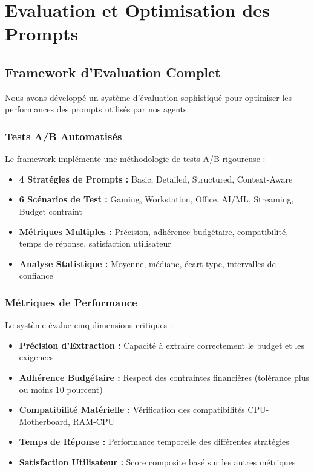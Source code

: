 \documentclass[12pt,a4paper]{article}
\begin{document}
\section{Evaluation et Optimisation des Prompts}

\subsection{Framework d'Evaluation Complet}
Nous avons d\'evelopp\'e un syst\`eme d'\'evaluation sophistiqu\'e pour optimiser les performances des prompts utilis\'es par nos agents.

\subsubsection{Tests A/B Automatis\'es}
Le framework impl\'emente une m\'ethodologie de tests A/B rigoureuse :
\begin{itemize}
    \item \textbf{4 Strat\'egies de Prompts :} Basic, Detailed, Structured, Context-Aware
    \item \textbf{6 Sc\'enarios de Test :} Gaming, Workstation, Office, AI/ML, Streaming, Budget contraint
    \item \textbf{M\'etriques Multiples :} Pr\'ecision, adh\'erence budg\'etaire, compatibilit\'e, temps de r\'eponse, satisfaction utilisateur
    \item \textbf{Analyse Statistique :} Moyenne, m\'ediane, \'ecart-type, intervalles de confiance
\end{itemize}

\subsubsection{M\'etriques de Performance}
Le syst\`eme \'evalue cinq dimensions critiques :
\begin{itemize}
    \item \textbf{Pr\'ecision d'Extraction :} Capacit\'e \`a extraire correctement le budget et les exigences
    \item \textbf{Adh\'erence Budg\'etaire :} Respect des contraintes financi\`eres (tol\'erance plus ou moins 10 pourcent)
    \item \textbf{Compatibilit\'e Mat\'erielle :} V\'erification des compatibilit\'es CPU-Motherboard, RAM-CPU
    \item \textbf{Temps de R\'eponse :} Performance temporelle des diff\'erentes strat\'egies
    \item \textbf{Satisfaction Utilisateur :} Score composite bas\'e sur les autres m\'etriques
\end{itemize}
\end{document}
